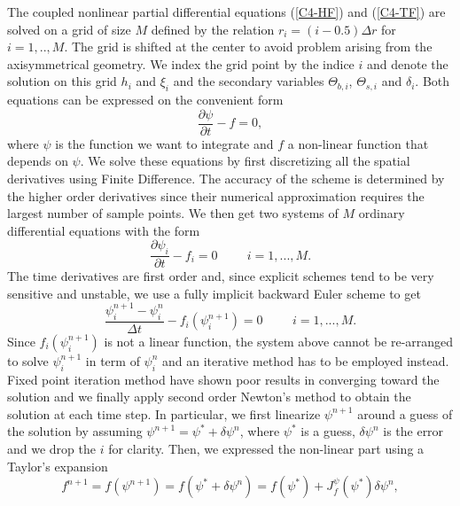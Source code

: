 The coupled nonlinear partial differential equations (\ref{C4-HF}) and
(\ref{C4-TF}) are solved on a grid of size $M$ defined by the relation
$r_i =  (i-0.5)\Delta r$ for  $i=1,..,M$. The  grid is shifted  at the
center to avoid  problem arising from the  axisymmetrical geometry. We
index the grid point by the indice $i$ and denote the solution on this
grid  $h_i$ and  $\xi_i$ and  the secondary  variables $\Theta_{b,i}$,
$\Theta_{s,i}$ and $\delta_i$. Both equations  can be expressed on the
convenient form
\begin{equation}
  \frac{\partial \psi}{\partial t} - f = 0,
\end{equation}
where $\psi$  is the function we  want to integrate and  $f$ a non-linear
function  that depends  on $\psi$.   We  solve these  equations by  first
discretizing all the spatial  derivatives using Finite Difference. The
accuracy of the  scheme is determined by the  higher order derivatives
since  their numerical  approximation requires  the largest  number of
sample points.  We  then get two systems of  $M$ ordinary differential
equations with the form
\begin{equation}
  \frac{\partial \psi_i}{\partial t} - f_i = 0 \hspace{1cm} i = 1,...,M.
\end{equation}
The time derivatives are first  order and, since explicit schemes tend
to be  very sensitive and unstable,  we use a fully  implicit backward
Euler scheme to get
\begin{equation}
  \frac{\psi_i^{n+1}-\psi_i^n}{\Delta t} - f_i(\psi_i^{n+1}) = 0 \hspace{1cm} i
  = 1,...,M.
  \label{C4-Num-1}
\end{equation}
Since  $f_i(\psi_i^{n+1})$ is  not a  linear function,  the system  above
cannot be re-arranged to solve $\psi_i^{n+1}$ in term of $\psi_i^{n}$ and an
iterative method  has to  be employed  instead. Fixed  point iteration
method have shown  poor results in converging toward  the solution and
we finally apply  second order Newton's method to  obtain the solution
at each time step.  In particular, we first linearize $\psi^{n+1}$ around
a guess  of the solution  by assuming $\psi^{n+1}=\psi^*+\delta  \psi^n$, where
$\psi^*$ is a  guess, $\delta \psi^n$ is  the error and we drop  the $i$ for
clarity.   Then, we  expressed the  non-linear part  using a  Taylor's
expansion
\begin{equation}
  f^{n+1}=f(\psi^{n+1})=f(\psi^*+\delta
  \psi^n)=f(\psi^*)+J^\psi_{f}(\psi^*)\delta \psi^n,
  \label{C4-Fn1}
\end{equation}
